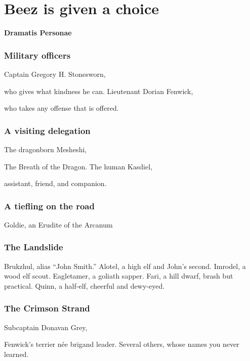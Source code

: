 \section{Beez is given a choice}
\textbf{\LARGE Dramatis Personae}
\begin{multicols}{2}


\subsubsection{Military officers}
Captain Gregory H. Stonesworn,\par who gives what kindness he can. \newline
Lieutenant Dorian Fenwick,\par who takes any offense that is offered.

\subsubsection{A visiting delegation}
The dragonborn Mesheshi,\par The Breath of the Dragon. \newline
The human Kasdiel,\par assistant, friend, and companion. \newline

\subsubsection{A tiefling on the road}
Goldie, an Erudite of the Arcanum


\subsubsection{The Landslide}
Brukzhul, alias ``John Smith.'' \newline
Alotel, a high elf and John's second. \newline
Imrodel, a wood elf scout. \newline
Eagletamer, a goliath sapper. \newline
Fari, a hill dwarf, brash but practical. \newline
Quinn, a half-elf, cheerful and dewy-eyed. \newline

\subsubsection{The Crimson Strand}
Subcaptain Donavan Grey,\par Fenwick's terrier n\'ee brigand leader. \newline
Several others, whose names you never learned.


\end{multicols}

